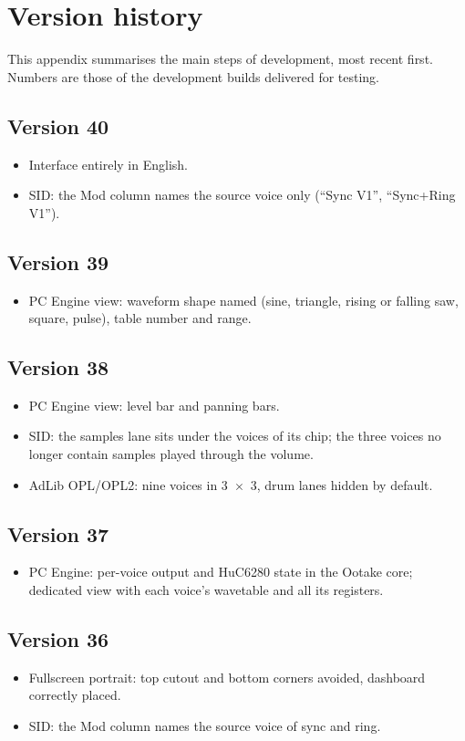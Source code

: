 \chapter{Version history}
This appendix summarises the main steps of \soft development, most recent first. Numbers are those of the
development builds delivered for testing.

\section*{Version 40}
\begin{itemize}
  \item Interface entirely in English.
  \item SID: the Mod column names the source voice only (``Sync V1'', ``Sync+Ring V1'').
\end{itemize}
\section*{Version 39}
\begin{itemize}
  \item PC Engine view: waveform shape named (sine, triangle, rising or falling saw, square, pulse), table number and
        range.
\end{itemize}
\section*{Version 38}
\begin{itemize}
  \item PC Engine view: level bar and panning bars.
  \item SID: the samples lane sits under the voices of its chip; the three voices no longer contain samples played
        through the volume.
  \item AdLib OPL/OPL2: nine voices in 3~$\times$~3, drum lanes hidden by default.
\end{itemize}
\section*{Version 37}
\begin{itemize}
  \item PC Engine: per-voice output and HuC6280 state in the Ootake core; dedicated view with each voice's wavetable
        and all its registers.
\end{itemize}
\section*{Version 36}
\begin{itemize}
  \item Fullscreen portrait: top cutout and bottom corners avoided, dashboard correctly placed.
  \item SID: the Mod column names the source voice of sync and ring.
\end{itemize}
